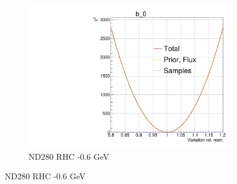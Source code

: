 \begin{figure}[!h]
\begin{subfigure}[t]{0.32\textwidth}
	\includegraphics[width=\textwidth, trim={0mm 0mm 0mm 11mm}, clip,page=30]{figures/mach3/Asimov/Full_LLHscan_18July_BeRPA_U_ND280logL_scan}
	\caption{ND280 RHC -0.6 GeV}
\end{subfigure}


\end{figure}
